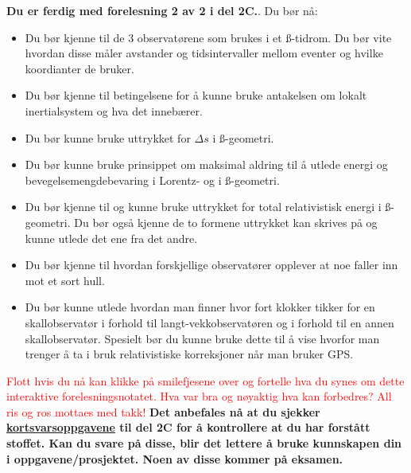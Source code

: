 \documentclass{beamer}
\let\hrefori\href
\renewcommand{\href}[2]{{\setlength{\fboxsep}{1pt}\colorbox{sunset}{\hrefori{#1}{#2}}}}
\newcommand{\pagebutton}[1]{\setbeamertemplate{button}{\tikz\node[inner xsep = 5pt, draw = structure!90, fill = green(ryb), rounded corners = 8pt]{\color{amber}\Large\insertbuttontext};}\beamerbutton{#1}}
\begin{document}
\begin{frame}
\label{oppsummering}
\hyperlink{gps20}{\pagebutton{\small Forrige side}}\href{https://nettskjema.no/a/171674}{ \Changey[1][yellow]{-2}}
\tiny
{\bf Du er ferdig med forelesning 2 av 2 i del 2C.}. Du bør nå:
\begin{itemize}
\item Du bør kjenne til de 3 observatørene som brukes i et \ss-tidrom. Du bør vite hvordan disse måler avstander og tidsintervaller mellom eventer og hvilke koordianter de bruker.
\item Du bør kjenne til betingelsene for å kunne bruke antakelsen om lokalt inertialsystem og hva det innebærer.
\item Du bør kunne bruke uttrykket for $\Delta s$ i \ss-geometri.
\item Du bør kunne bruke prinsippet om maksimal aldring til å utlede energi og bevegelsemengdebevaring i Lorentz- og i \ss-geometri.
\item Du bør kjenne til og kunne bruke uttrykket for total relativistisk energi i \ss-geometri. Du bør også kjenne de to formene uttrykket kan skrives på og kunne utlede det ene fra det andre.
\item Du bør kjenne til hvordan forskjellige observatører opplever at noe faller inn mot et sort hull.
\item Du bør kunne utlede hvordan man finner hvor fort klokker tikker for en skallobservatør i forhold til langt-vekkobservatøren og i forhold til en annen skallobservatør. Spesielt bør du kunne bruke dette til å vise hvorfor man trenger å ta i bruk relativistiske korreksjoner når man bruker GPS.
\end{itemize}
\textcolor{red}{Flott hvis du nå kan klikke på smilefjesene over og fortelle hva du synes om dette interaktive forelesningsnotatet. Hva var bra og nøyaktig hva kan forbedres? All ris og ros mottaes med takk!}
{\bf Det anbefales nå at du sjekker \href{https://www.uio.no/studier/emner/matnat/astro/AST2000/h21/undervisningsmateriell/kortsvarsoppgaver/del2c.pdf}{kortsvarsoppgavene} til del 2C for å kontrollere at du har forstått stoffet. Kan du svare på disse, blir det lettere å bruke kunnskapen din i oppgavene/prosjektet. Noen av disse kommer på eksamen.}
\end{frame}
\end{document}
